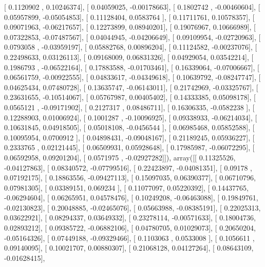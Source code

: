 \documentclass{article}
\begin{document}
       [ 0.1120902 ,  0.10246374],
       [ 0.04059025, -0.00178663],
       [ 0.1802742 , -0.00460604],
       [ 0.05957899, -0.05054853],
       [ 0.11128404,  0.0583764 ],
       [ 0.11711761,  0.10578357],
       [ 0.09071963, -0.06217657],
       [ 0.12273899,  0.08940201],
       [ 0.19076967,  0.10666989],
       [ 0.07322853, -0.07487567],
       [ 0.04044945, -0.04206649],
       [ 0.09109954, -0.02720963],
       [ 0.0793058 , -0.03959197],
       [ 0.05882768,  0.00896204],
       [ 0.11124582, -0.00237076],
       [ 0.22498633,  0.03126113],
       [ 0.09168009,  0.06831326],
       [ 0.04929054,  0.03542214],
       [ 0.1986793 , -0.06522164],
       [ 0.17883588, -0.01703461],
       [ 0.16339064, -0.07006667],
       [ 0.06561759, -0.00922555],
       [ 0.04833617, -0.04349618],
       [ 0.10639792, -0.08247747],
       [ 0.04625434,  0.07480728],
       [ 0.13635747, -0.06143011],
       [ 0.21742969, -0.03325767],
       [ 0.23631655, -0.10514067],
       [ 0.05767987,  0.00405402],
       [ 0.14333385,  0.05098178],
       [ 0.0565121 , -0.09171902],
       [ 0.2127317 ,  0.08486711],
       [ 0.16306335, -0.0582238 ],
       [ 0.12288903,  0.01006924],
       [ 0.1001287 , -0.10096925],
       [ 0.09338933, -0.06214034],
       [ 0.10631845,  0.04918505],
       [ 0.05018108, -0.0456544 ],
       [ 0.06985468,  0.05852588],
       [ 0.10095954,  0.0700912 ],
       [ 0.04898431, -0.09048167],
       [ 0.21189245,  0.05936227],
       [ 0.2333765 ,  0.02121445],
       [ 0.06509931,  0.05928648],
       [ 0.17985987, -0.06072295],
       [ 0.06592958,  0.09201204],
       [ 0.0571975 , -0.02927282]]), array([[ 0.11325526, -0.04127863],
       [ 0.08340572, -0.07799516],
       [ 0.22423897, -0.04081351],
       [ 0.09178   ,  0.07192175],
       [ 0.18863556, -0.09427113],
       [ 0.15097035,  0.06390377],
       [ 0.06710796,  0.07981305],
       [ 0.03389151,  0.069234  ],
       [ 0.11077097,  0.05220392],
       [ 0.14437765, -0.06294604],
       [ 0.06265951,  0.04578476],
       [ 0.10249208, -0.06463088],
       [ 0.19849761, -0.02130823],
       [ 0.20048885, -0.02465076],
       [ 0.05663988, -0.08385191],
       [ 0.22025313,  0.03622921],
       [ 0.08294337,  0.03649332],
       [ 0.23278114, -0.00571633],
       [ 0.18004736,  0.02893212],
       [ 0.09385722, -0.06882106],
       [ 0.04780705,  0.01029073],
       [ 0.20650204, -0.05164326],
       [ 0.07449188, -0.09329466],
       [ 0.1103063 ,  0.0533008 ],
       [ 0.1056611 ,  0.09140095],
       [ 0.10021707,  0.00880307],
       [ 0.21068128,  0.04127264],
       [ 0.08643109, -0.01628415],
\end{document}
